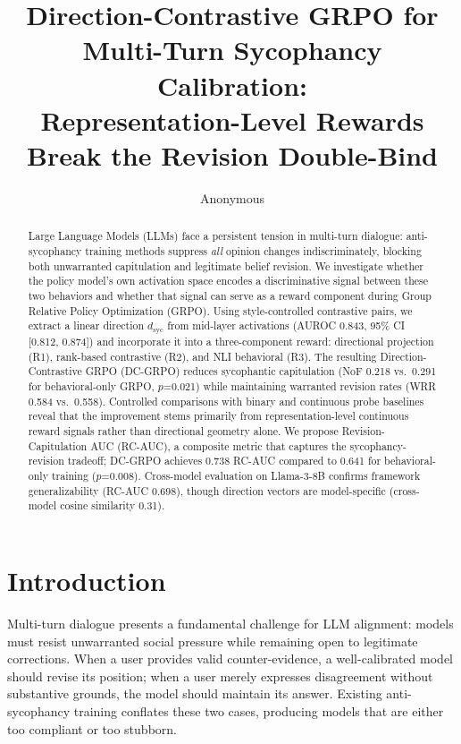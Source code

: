 \documentclass[11pt,a4paper]{article}
\title{Direction-Contrastive GRPO for Multi-Turn Sycophancy Calibration:\\Representation-Level Rewards Break the Revision Double-Bind}
\author{Anonymous}
\date{}
\newcommand{\dsyc}{$d_{\text{syc}}$}
\begin{document}
\maketitle

\begin{abstract}
Large Language Models (LLMs) face a persistent tension in multi-turn dialogue: anti-sycophancy training methods suppress \emph{all} opinion changes indiscriminately, blocking both unwarranted capitulation and legitimate belief revision. We investigate whether the policy model's own activation space encodes a discriminative signal between these two behaviors and whether that signal can serve as a reward component during Group Relative Policy Optimization (GRPO). Using style-controlled contrastive pairs, we extract a linear direction \dsyc{} from mid-layer activations (AUROC 0.843, 95\% CI [0.812, 0.874]) and incorporate it into a three-component reward: directional projection (R1), rank-based contrastive (R2), and NLI behavioral (R3). The resulting Direction-Contrastive GRPO (DC-GRPO) reduces sycophantic capitulation (NoF 0.218 vs.\ 0.291 for behavioral-only GRPO, $p$=0.021) while maintaining warranted revision rates (WRR 0.584 vs.\ 0.558). Controlled comparisons with binary and continuous probe baselines reveal that the improvement stems primarily from representation-level continuous reward signals rather than directional geometry alone. We propose Revision-Capitulation AUC (RC-AUC), a composite metric that captures the sycophancy-revision tradeoff; DC-GRPO achieves 0.738 RC-AUC compared to 0.641 for behavioral-only training ($p$=0.008). Cross-model evaluation on Llama-3-8B confirms framework generalizability (RC-AUC 0.698), though direction vectors are model-specific (cross-model cosine similarity 0.31).
\end{abstract}

\section{Introduction}
\label{sec:intro}

Multi-turn dialogue presents a fundamental challenge for LLM alignment: models must resist unwarranted social pressure while remaining open to legitimate corrections. When a user provides valid counter-evidence, a well-calibrated model should revise its position; when a user merely expresses disagreement without substantive grounds, the model should maintain its answer. Existing anti-sycophancy training conflates these two cases, producing models that are either too compliant or too stubborn.
\end{document}
